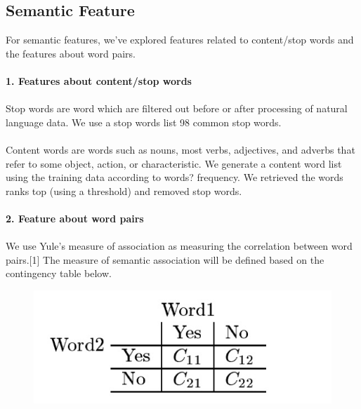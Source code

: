 \subsection{Semantic Feature}
For semantic features, we've explored features related to content/stop words and the features about word pairs.\\\\
\textbf{1. Features about content/stop words} 
\\\\Stop words are word which are filtered out before or after processing of natural language data. We use a stop words list 98 common stop words.\\
\\Content words are words such as nouns, most verbs, adjectives, and adverbs that refer to some object, action, or characteristic. We generate a content word list using the training data according to words? frequency. We retrieved the words ranks top (using a threshold) and removed stop words.\\\\
\textbf{2. Feature about word pairs}
\\\\We use Yule's measure of association as measuring the correlation between word pairs.[1] The measure of semantic association will be defined based on the contingency table below.
\begin{figure}
\centering  
\includegraphics[width = 0.4\linewidth]{./FIG/030/contigency}\hfill
\label{fig:020feature}
\end{figure}
